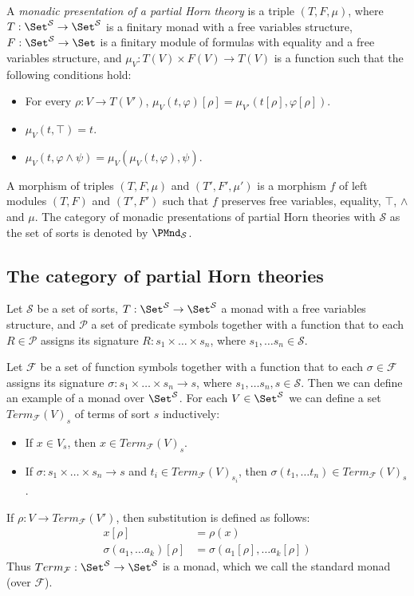 \begin{defn}
A \emph{monadic presentation of a partial Horn theory} is a triple $(T,F,\mu)$, where
    $T : \Set^\mathcal{S} \to \Set^\mathcal{S}$ is a finitary monad with a free variables structure,
    $F : \Set^\mathcal{S} \to \Set$ is a finitary module of formulas with equality and a free variables structure, and
    $\mu_V : T(V) \times F(V) \to T(V)$ is a function such that the following conditions hold:
\begin{itemize}
\item For every $\rho : V \to T(V')$, $\mu_V(t,\varphi)[\rho] = \mu_{V'}(t[\rho],\varphi[\rho])$.
\item $\mu_V(t, \top) = t$.
\item $\mu_V(t, \varphi \land \psi) = \mu_V(\mu_V(t, \varphi), \psi)$.
\end{itemize}
A morphism of triples $(T,F,\mu)$ and $(T',F',\mu')$ is a morphism $f$ of left modules $(T,F)$ and $(T',F')$ such that $f$ preserves free variables, equality, $\top$, $\land$ and $\mu$.
The category of monadic presentations of partial Horn theories with $\mathcal{S}$ as the set of sorts is denoted by $\PMnd_\mathcal{S}$.
\end{defn}

\subsection{The category of partial Horn theories}
\label{sec:PHT-rules}

Let $\mathcal{S}$ be a set of sorts, $T : \Set^\mathcal{S} \to \Set^\mathcal{S}$ a monad with a free variables structure,
    and $\mathcal{P}$ a set of predicate symbols together with a function that to each $R \in \mathcal{P}$
    assigns its signature $R : s_1 \times \ldots \times s_n$, where $s_1, \ldots s_n \in \mathcal{S}$.

Let $\mathcal{F}$ be a set of function symbols together with a function that to each $\sigma \in \mathcal{F}$ assigns its signature $\sigma : s_1 \times \ldots \times s_n \to s$, where $s_1, \ldots s_n, s \in \mathcal{S}$.
Then we can define an example of a monad over $\Set^\mathcal{S}$.
For each $V \in \Set^\mathcal{S}$ we can define a set $Term_\mathcal{F}(V)_s$ of terms of sort $s$ inductively:
\begin{itemize}
\item If $x \in V_s$, then $x \in Term_\mathcal{F}(V)_s$.
\item If $\sigma : s_1 \times \ldots \times s_n \to s$ and $t_i \in Term_\mathcal{F}(V)_{s_i}$, then $\sigma(t_1, \ldots t_n) \in Term_\mathcal{F}(V)_s$.
\end{itemize}
If $\rho : V \to Term_\mathcal{F}(V')$, then substitution is defined as follows:
\begin{align*}
x[\rho] & = \rho(x) \\
\sigma(a_1, \ldots a_k)[\rho] & = \sigma(a_1[\rho], \ldots a_k[\rho])
\end{align*}
Thus $Term_\mathcal{F} : \Set^\mathcal{S} \to \Set^\mathcal{S}$ is a monad, which we call the standard monad (over $\mathcal{F}$).

